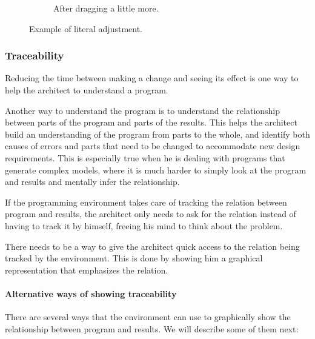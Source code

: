 \begin{figure}
\begin{subfigure}[b]{0.3\linewidth}
    \caption{After dragging a little more.}
  \end{subfigure}
  \caption{Example of literal adjustment.}
  \label{fig:lit:adjust}
\end{figure}


\subsubsection{Traceability}
\label{sec:traceability}
Reducing the time between making a change and seeing its effect is one way to help the architect to understand a program.

Another way to understand the program is to understand the relationship between parts of the program and parts of the results.
This helps the architect build an understanding of the program from parts to the whole, and identify both causes of errors and parts that need to be changed to accommodate new design requirements.
This is especially true when he is dealing with programs that generate complex models, where it is much harder to simply look at the program and results and mentally infer the relationship.

If the programming environment takes care of tracking the relation between program and results, the architect only needs to ask for the relation instead of having to track it by himself, freeing his mind to think about the problem.

There needs to be a way to give the architect quick access to the relation being tracked by the environment.
This is done by showing him a graphical representation that emphasizes the relation.

\paragraph{Alternative ways of showing traceability}
There are several ways that the environment can use to graphically show the relationship between program and results.
We will describe some of them next:

